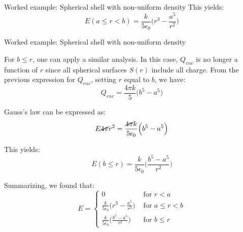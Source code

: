 {\begin{frame}{Worked example: Spherical shell with non-uniform density}
  This yields:
  \begin{equation*}
    E (a \le r < b)= \frac{k}{5 \epsilon_0} \Big(r^3 - \frac{a^5}{r^2}\Big)
  \end{equation*}

\end{frame}

%
%
%

\begin{frame}{Worked example: Spherical shell with non-uniform density}

  For $b \le r$, one can apply a similar analysis. In this case,
  $Q_{enc}$ is no longer a function of $r$
  since all spherical surfaces $S(r)$ include all charge.
  From the previous expression for $Q_{enc}$,
  setting $r$ equal to $b$, we have:
  \begin{equation*}
    Q_{enc} =
      \frac{4\pi k}{5} \Big(b^5 - a^5\Big)
  \end{equation*}

  Gauss's law can be expressed as:
  \begin{equation*}
    E \cancel{4\pi} r^2 =
     \frac{\cancel{4\pi} k}{5 \epsilon_0} \Big(b^5 - a^5\Big)
  \end{equation*}

  This yields:
  \begin{equation*}
    E (b \le r)= \frac{k}{5 \epsilon_0} \Big(\frac{b^5 - a^5}{r^2}\Big)
  \end{equation*}

  Summarizing, we found that:
  \begin{equation*}
    \displaystyle
    E =
      \begin{cases}
        0 & \text{ for } r < a\\
        \frac{k}{5 \epsilon_0} \Big(r^3 - \frac{a^5}{r^2}\Big) & \text{ for } a \le r < b\\
        \frac{k}{5 \epsilon_0} \Big(\frac{b^5 - a^5}{r^2}\Big) & \text{ for } b \le r
      \end{cases}
  \end{equation*}

\end{frame}

} %



